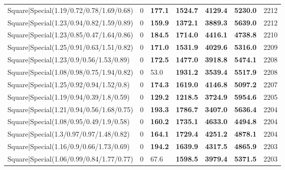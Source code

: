 \begin{tabular}{lrllllr}
 Square|Special(1.19/0.72/0.78/1.69/0.68)                      &             0   & \textbf{177.1} & \textbf{1524.7} & \textbf{4129.4} & \textbf{5230.0} &         2212 \\
 Square|Special(1.23/0.94/0.82/1.59/0.89)                      &             0   & \textbf{159.9} & \textbf{1372.1} & \textbf{3889.3} & \textbf{5639.0} &         2212 \\
 Square|Special(1.23/0.85/0.47/1.64/0.86)                      &             0   & \textbf{184.5} & \textbf{1714.0} & \textbf{4416.1} & \textbf{4738.8} &         2210 \\
 Square|Special(1.25/0.91/0.63/1.51/0.82)                      &             0   & \textbf{171.0} & \textbf{1531.9} & \textbf{4029.6} & \textbf{5316.0} &         2209 \\
 Square|Special(1.23/0.9/0.56/1.53/0.89)                       &             0   & \textbf{172.5} & \textbf{1477.0} & \textbf{3918.8} & \textbf{5474.1} &         2208 \\
 Square|Special(1.08/0.98/0.75/1.94/0.82)                      &             0   & 53.0           & \textbf{1931.2} & \textbf{3539.4} & \textbf{5517.9} &         2208 \\
 Square|Special(1.25/0.92/0.94/1.52/0.8)                       &             0   & \textbf{174.3} & \textbf{1619.0} & \textbf{4146.8} & \textbf{5097.2} &         2207 \\
 Square|Special(1.19/0.94/0.39/1.8/0.59)                       &             0   & \textbf{129.2} & \textbf{1218.5} & \textbf{3724.9} & \textbf{5954.6} &         2205 \\
 Square|Special(1.21/0.94/0.56/1.68/0.75)                      &             0   & \textbf{193.3} & \textbf{1786.7} & \textbf{3407.0} & \textbf{5636.4} &         2204 \\
 Square|Special(1.08/0.95/0.49/1.9/0.58)                       &             0   & \textbf{160.2} & \textbf{1735.1} & \textbf{4633.0} & \textbf{4494.8} &         2204 \\
 Square|Special(1.3/0.97/0.97/1.48/0.82)                       &             0   & \textbf{164.1} & \textbf{1729.4} & \textbf{4251.2} & \textbf{4878.1} &         2204 \\
 Square|Special(1.16/0.9/0.66/1.73/0.69)                       &             0   & \textbf{194.2} & \textbf{1639.9} & \textbf{4317.5} & \textbf{4865.9} &         2203 \\
 Square|Special(1.06/0.99/0.84/1.77/0.77)                      &             0   & 67.6           & \textbf{1598.5} & \textbf{3979.4} & \textbf{5371.5} &         2203 \\

\end{tabular}
